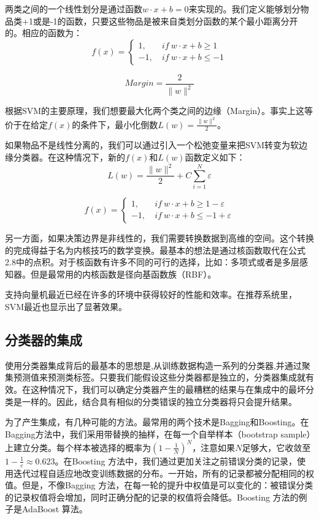 \documentclass{article}
\begin{document}
两类之间的一个线性划分是通过函数$w\cdot x+b=0$来实现的。我们定义能够划分物品类+1或是-1的函数，只要这些物品是被来自类划分函数的某个最小距离分开的。相应的函数为：
\[
f(x)=\left\{
\begin{array}{ll}
1,\ & if\ w\cdot x+b\geq 1\\
-1,\ & if\ w\cdot x+b\leq -1
\end{array}
\right.
\]

$$ Margin=\frac{2}{\|w\|^2} $$

根据SVM的主要原理，我们想要最大化两个类之间的边缘（Margin）。事实上这等价于在给定$f(x)$的条件下，最小化倒数$L(w)=\frac{\|w\|^2}{2}$。

如果物品不是线性分离的，我们可以通过引入一个松弛变量来把SVM转变为软边缘分类器。在这种情况下，新的$f(x)$和$L(w)$函数定义如下：
$$ L(w)=\frac{\|w\|^2}{2}+C\mathop{\sum}\limits_{i=1}^N\varepsilon$$

\[
f(x)=\left\{
\begin{array}{ll}
1,\ & if\ w\cdot x+b\geq 1-\varepsilon\\
-1,\ & if\ w\cdot x+b\leq -1+\varepsilon
\end{array}
\right.
\]

另一方面，如果决策边界是非线性的，我们需要转换数据到高维的空间。这个转换的完成得益于名为内核技巧的数学变换。最基本的想法是通过核函数取代在公式2.8中的点积。对于核函数有许多不同的可行的选择，比如：多项式或者是多层感知器。但是最常用的内核函数是径向基函数族（RBF）。

支持向量机最近已经在许多的环境中获得较好的性能和效率。在推荐系统里，SVM最近也显示出了显著效果。

\subsection{分类器的集成}
使用分类器集成背后的最基本的思想是,从训练数据构造一系列的分类器,并通过聚集预测值来预测类标签。只要我们能假设这些分类器都是独立的，分类器集成就有效。在这种情况下，我们可以确定分类器产生的最糟糕的结果与在集成中的最坏分类是一样的。因此，结合具有相似的分类错误的独立分类器将只会提升结果。

为了产生集成，有几种可能的方法。最常用的两个技术是Bagging和Boosting。在Bagging方法中，我们采用带替换的抽样，在每一个自举样本（bootstrap sample）上建立分类。每个样本被选择的概率为$(1-\frac{1}{N})^N$，注意如果$N$足够大，它收敛至$1-\frac{1}{e}\approx 0.623$。在Boosting 方法中，我们通过更加关注之前错误分类的记录，使用迭代过程自适应地改变训练数据的分布。一开始，所有的记录都被分配相同的权值。但是，不像Bagging 方法，在每一轮的提升中权值是可以变化的：被错误分类的记录权值将会增加，同时正确分配的记录的权值将会降低。Boosting 方法的例子是AdaBoost 算法。
\end{document}

